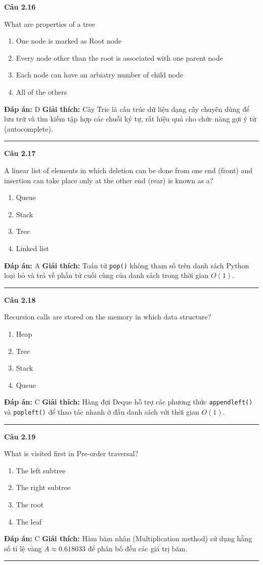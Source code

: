 \documentclass[11pt,a4paper]{article}
\newenvironment{question}[1]{%
  \par\vspace{1em}\noindent\textbf{\large Câu #1}\par\vspace{0.4em}
}{%
  \par\vspace{1em}\hrule\vspace{0.6em}
}
\newenvironment{choices}{%
  \begin{enumerate}[label=\textbf{\Alph*.},leftmargin=2.2em,itemsep=2pt,topsep=3pt]
}{%
  \end{enumerate}
}
\newcommand{\choice}{\item}
\begin{document}
\begin{question}{2.16}
What are properties of a tree
\begin{choices}
\choice One node is marked as Root node
\choice Every node other than the root is associated with one parent node
\choice Each node can have an arbiatry number of child node
\choice All of the others
\end{choices}
\textbf{Đáp án:} D
\textbf{Giải thích:} Cây Trie là cấu trúc dữ liệu dạng cây chuyên dùng để lưu trữ và tìm kiếm tập hợp các chuỗi ký tự, rất hiệu quả cho chức năng gợi ý từ (autocomplete).
\end{question}

\begin{question}{2.17}
A linear list of elements in which deletion can be done from one end (front) and insertion can take place only at the other end (rear) is known as a?
\begin{choices}
\choice Queue
\choice Stack
\choice Tree
\choice Linked list
\end{choices}
\textbf{Đáp án:} A
\textbf{Giải thích:} Toán tử \texttt{pop()} không tham số trên danh sách Python loại bỏ và trả về phần tử cuối cùng của danh sách trong thời gian $O(1)$.
\end{question}

\begin{question}{2.18}
Recursion calls are stored on the memory in which data structure?
\begin{choices}
\choice Heap
\choice Tree
\choice Stack
\choice Queue
\end{choices}
\textbf{Đáp án:} C
\textbf{Giải thích:} Hàng đợi Deque hỗ trợ các phương thức \texttt{appendleft()} và \texttt{popleft()} để thao tác nhanh ở đầu danh sách với thời gian $O(1)$.
\end{question}

\begin{question}{2.19}
What is visited first in Pre-order traversal?
\begin{choices}
\choice The left subtree
\choice The right subtree
\choice The root
\choice The leaf
\end{choices}
\textbf{Đáp án:} C
\textbf{Giải thích:} Hàm băm nhân (Multiplication method) sử dụng hằng số tỉ lệ vàng $A \approx 0.618033$ để phân bố đều các giá trị băm.
\end{question}
\end{document}

